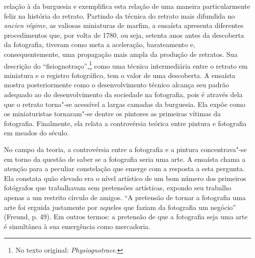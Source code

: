 relação à da burguesia e exemplifica esta relação de uma maneira
particularmente feliz na história do retrato. Partindo da técnica do
retrato mais difundida no \emph{ancien régime}, as valiosas miniaturas
de marfim, a ensaísta apresenta diferentes procedimentos que, por volta de
1780, ou seja, setenta anos antes da descoberta da fotografia, tiveram
como meta a aceleração, barateamento e, consequentemente, uma propagação
mais ampla da produção de retratos. Sua descrição do
``fisiognotraço'',\footnote{No texto original:
  \emph{Physiognotrace}. \versal{[N. T.]}} como uma técnica intermediária
entre o retrato em
miniatura e o registro fotográfico, tem o valor de uma descoberta. A
ensaísta mostra posteriormente como o desenvolvimento técnico alcança seu
padrão adequado ao do desenvolvimento da sociedade na fotografia, pois é através dela que o retrato torna"-se
acessível a largas camadas da burguesia. Ela expõe como os miniaturistas
tornaram"-se dentre os pintores as primeiras vítimas da fotografia.
Finalmente, ela relata a controvérsia teórica entre pintura e
fotografia em meados do século.

No campo da teoria, a controvérsia entre a fotografia e a pintura
concentrava"-se em torno da questão de saber se a fotografia seria uma arte.
A ensaísta chama a atenção para a peculiar constelação que emerge com a
resposta a esta pergunta. Ela constata quão elevado era o nível
artístico de um bom número dos primeiros fotógrafos que trabalhavam sem
pretensões artísticas, expondo seu trabalho apenas a um restrito
círculo de amigos. ``A pretensão de tornar a fotografia uma arte foi
erguida justamente por aqueles que faziam da fotografia um negócio''
(Freund, p. 49). Em outros termos: a pretensão de que a
fotografia seja uma arte é simultânea à sua emergência como mercadoria.

